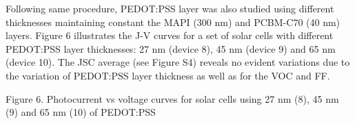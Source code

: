 %





Following same procedure, PEDOT:PSS layer was also studied using different thicknesses maintaining constant the MAPI (300 nm) and PCBM-C70 (40 nm) layers.
Figure 6 illustrates the J-V curves for a set of solar cells with different PEDOT:PSS layer thicknesses: 27 nm (device 8), 45 nm (device 9) and 65 nm (device 10). The JSC average (see Figure S4) reveals no evident variations due to the variation of PEDOT:PSS layer thickness as well as for the VOC and FF.

Figure 6. Photocurrent vs voltage curves for solar cells using 27 nm (8), 45 nm (9) and 65 nm (10) of PEDOT:PSS 



